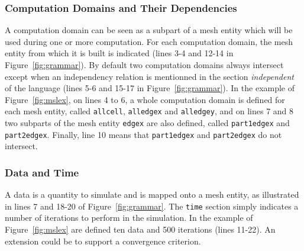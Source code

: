 \subsubsection*{Computation Domains and Their Dependencies}
A computation domain can be seen as a subpart of a mesh entity which will be used during one or more computation. For each computation domain, the mesh entity from which it is built is indicated (lines 3-4 and 12-14 in Figure~\ref{fig:grammar}). By default two computation domains always intersect except when an independency relation is mentionned in the section \emph{independent} of the language (lines 5-6 and 15-17 in Figure~\ref{fig:grammar}). In the example of Figure~\ref{fig:mslex}, on lines 4 to 6, a whole computation domain is defined for each mesh entity, called \texttt{allcell}, \texttt{alledgex} and \texttt{alledgey}, and on lines 7 and 8 two subparts of the mesh entity \texttt{edgex} are also defined, called \texttt{part1edgex} and \texttt{part2edgex}. Finally, line 10 means that \texttt{part1edgex} and \texttt{part2edgex} do not intersect.

\subsubsection*{Data and Time}
A data is a quantity to simulate and is mapped onto a mesh entity, as illustrated in lines 7 and 18-20 of Figure~\ref{fig:grammar}. The \texttt{time} section simply indicates a number of iterations to perform in the simulation. In the example of Figure~\ref{fig:mslex} are defined ten data and 500 iterations (lines 11-22). An extension could be to support a convergence criterion.

